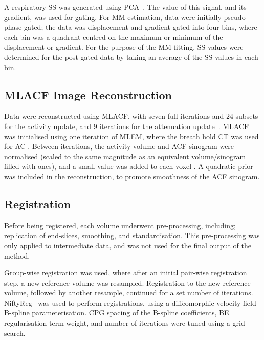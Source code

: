         A respiratory \gls{SS} was generated using \gls{PCA}~\cite{Thielemans2011}. The value of this signal, and its gradient, was used for gating. For \gls{MM} estimation, data were initially pseudo-phase gated; the data was displacement and gradient gated into four bins, where each bin was a quadrant centred on the maximum or minimum of the displacement or gradient. %
        For the purpose of the \gls{MM} fitting, \gls{SS} values were determined for the post-gated data by taking an average of the \gls{SS} values in each bin.
        
    \subsection{\acrshort{MLACF} Image Reconstruction} \label{sec:mlacf_image_reconstruction}
        Data were reconstructed using \acrshort{MLACF}, with seven full iterations and $24$ subsets for the activity update, and $9$ iterations for the attenuation update~\cite{Nuyts2012ML-reconstructionFactors}. \acrshort{MLACF} was initialised using one iteration of \acrshort{MLEM}, where the breath hold \acrshort{CT} was used for \gls{AC}%
        . Between iterations, the activity volume and \gls{ACF} sinogram were normalised (scaled to the same magnitude as an equivalent volume/sinogram filled with ones), and a small value was added to each voxel%
        . A quadratic prior was included in the reconstruction, to promote smoothness of the \gls{ACF} sinogram.
    
    \vspace{-0.5cm}
    
    \subsection{Registration} \label{sec:registration}
        Before being registered, each volume underwent pre-processing, including; replication of end-slices, smoothing, and standardisation. This pre-processing was only applied to intermediate data, and was not used for the final output of the method.
        
        Group-wise registration was used, where after an initial pair-wise registration step, a new reference volume was resampled. Registration to the new reference volume, followed by another resample, continued for a set number of iterations. NiftyReg~\cite{Modat2010} was used to perform registrations, using a diffeomorphic velocity field B-spline parameterisation. \acrlong{CPG} spacing of the B-spline coefficients, \acrlong{BE} regularisation term weight, and number of iterations were tuned using a grid search.
        
